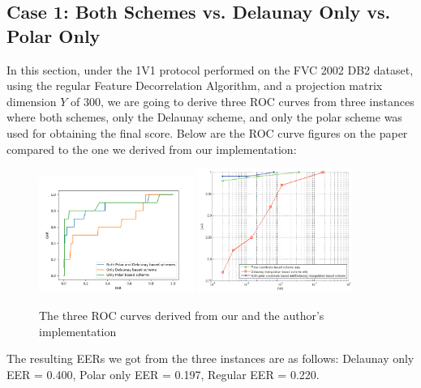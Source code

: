 \documentclass[fyp]{socreport}
\begin{document}
\subsection{Case 1: Both Schemes vs. Delaunay Only vs. Polar Only}
In this section, under the 1V1 protocol performed on the FVC 2002 DB2 dataset, using the regular Feature Decorrelation Algorithm, and a projection matrix dimension $Y$ of 300, we are going to derive  three ROC curves from three instances where both schemes, only the Delaunay scheme, and only the polar scheme was used for obtaining the final score. Below are the ROC curve figures on the paper compared to the one we derived from our implementation:

\begin{figure}[H]
	\centering
	\includegraphics[width=0.45\textwidth]
	{3ROC}
	\includegraphics[width=0.45\textwidth]
	{3ROC2}
	\caption{The three ROC curves derived from our and the author's implementation}
\end{figure}

The resulting EERs we got from the three instances are as follows: Delaunay only EER = 0.400, Polar only EER = 0.197, Regular EER = 0.220.
\end{document}

